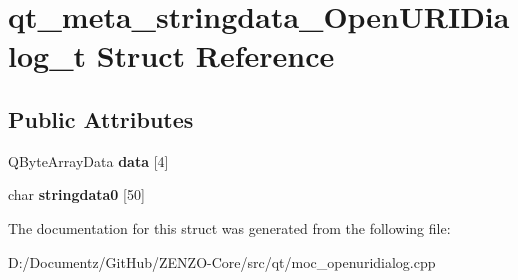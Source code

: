 \hypertarget{structqt__meta__stringdata___open_u_r_i_dialog__t}{}\section{qt\+\_\+meta\+\_\+stringdata\+\_\+\+Open\+U\+R\+I\+Dialog\+\_\+t Struct Reference}
\label{structqt__meta__stringdata___open_u_r_i_dialog__t}
\subsection*{Public Attributes}
\begin{DoxyCompactItemize}
\item 
\mbox{\label{structqt__meta__stringdata___open_u_r_i_dialog__t_a79f64c1e8f73364107c6b130639ab55a}} 
Q\+Byte\+Array\+Data {\bfseries data} \mbox{[}4\mbox{]}
\item 
\mbox{\label{structqt__meta__stringdata___open_u_r_i_dialog__t_a4bc52568b44679bfa5dc3b30f990bd89}} 
char {\bfseries stringdata0} \mbox{[}50\mbox{]}
\end{DoxyCompactItemize}


The documentation for this struct was generated from the following file\+:\begin{DoxyCompactItemize}
\item 
D\+:/\+Documentz/\+Git\+Hub/\+Z\+E\+N\+Z\+O-\/\+Core/src/qt/moc\+\_\+openuridialog.\+cpp\end{DoxyCompactItemize}
